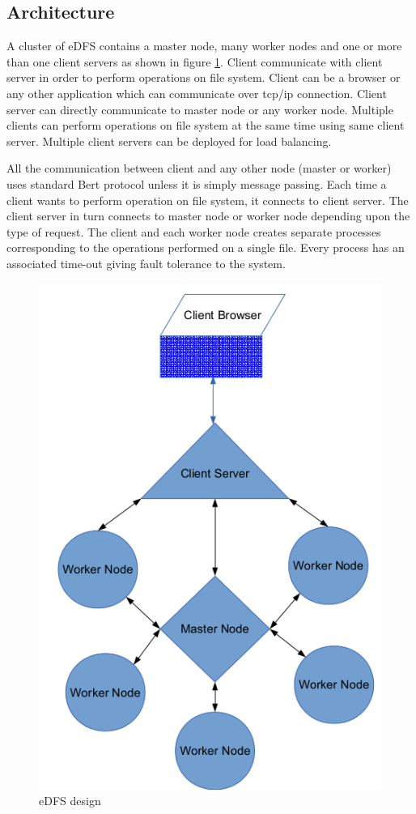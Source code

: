 \documentclass[a4paper,12pt]{article}
\begin{document}
\subsection{Architecture}
A cluster of eDFS contains a master node, many worker nodes and one or more than one client servers as shown in figure \ref{edfs_design}. Client communicate with client server in order to perform operations on file system. Client can be a browser or any other application which can communicate over tcp/ip connection. Client server can directly communicate to master node or any worker node. Multiple clients can perform operations on file system at the same time using same client server. Multiple client servers can be deployed for load balancing.

All the communication between client and any other node (master or worker) uses standard Bert protocol \cite{bert} unless it is simply message passing. Each time a client wants to perform operation on file system, it connects to client server. The client server in turn connects to master node or worker node depending upon the type of request. The client and each worker node creates separate processes corresponding to the operations performed on a single file. Every process has an associated time-out giving fault tolerance to the system.

\begin{figure}[h]
  \begin{center}
    \includegraphics[scale = 0.5]{images/design}
  \end{center}
  \caption{eDFS design}
  \label{edfs_design}
\end{figure}
\end{document}
